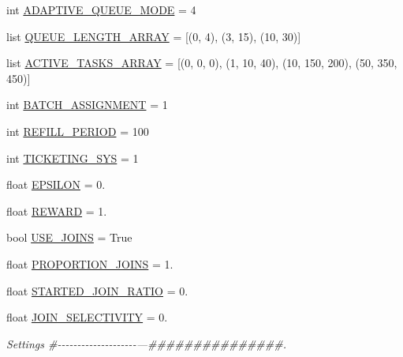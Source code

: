 \begin{DoxyCompactItemize}
int \mbox{\hyperlink{namespacedynamicfilterapp_1_1toggles_ae5f3a5957b65dd5d074c52ef01e0f732}{A\+D\+A\+P\+T\+I\+V\+E\+\_\+\+Q\+U\+E\+U\+E\+\_\+\+M\+O\+DE}} = 4
\item 
list \mbox{\hyperlink{namespacedynamicfilterapp_1_1toggles_af8d4fe75258dd9f8b4c8cdb1b5b68ad1}{Q\+U\+E\+U\+E\+\_\+\+L\+E\+N\+G\+T\+H\+\_\+\+A\+R\+R\+AY}} = \mbox{[}(0, 4), (3, 15), (10, 30)\mbox{]}
\item 
list \mbox{\hyperlink{namespacedynamicfilterapp_1_1toggles_a8f7b1e7beea29c74a7defab7d44ef294}{A\+C\+T\+I\+V\+E\+\_\+\+T\+A\+S\+K\+S\+\_\+\+A\+R\+R\+AY}} = \mbox{[}(0, 0, 0), (1, 10, 40), (10, 150, 200), (50, 350, 450)\mbox{]}
\item 
int \mbox{\hyperlink{namespacedynamicfilterapp_1_1toggles_ab1f6b66c3fc1afbd280b14695b54f33f}{B\+A\+T\+C\+H\+\_\+\+A\+S\+S\+I\+G\+N\+M\+E\+NT}} = 1
\item 
int \mbox{\hyperlink{namespacedynamicfilterapp_1_1toggles_a26c4f956b0a9438426925bee66b89a2b}{R\+E\+F\+I\+L\+L\+\_\+\+P\+E\+R\+I\+OD}} = 100
\item 
int \mbox{\hyperlink{namespacedynamicfilterapp_1_1toggles_a4efd3667e6643a4cd2b96c4e647fa2f7}{T\+I\+C\+K\+E\+T\+I\+N\+G\+\_\+\+S\+YS}} = 1
\item 
float \mbox{\hyperlink{namespacedynamicfilterapp_1_1toggles_a5f5369d7244632ac071379fbb460c8fe}{E\+P\+S\+I\+L\+ON}} = 0.
\item 
float \mbox{\hyperlink{namespacedynamicfilterapp_1_1toggles_a058a8495c920cb75e731931532524c19}{R\+E\+W\+A\+RD}} = 1.
\item 
bool \mbox{\hyperlink{namespacedynamicfilterapp_1_1toggles_a5740b01cf5a5537c768820e758a2cedf}{U\+S\+E\+\_\+\+J\+O\+I\+NS}} = True
\item 
float \mbox{\hyperlink{namespacedynamicfilterapp_1_1toggles_a943c36531eb68e7cbe2ee3ac0010f01f}{P\+R\+O\+P\+O\+R\+T\+I\+O\+N\+\_\+\+J\+O\+I\+NS}} = 1.
\item 
float \mbox{\hyperlink{namespacedynamicfilterapp_1_1toggles_aad6ab6da90f08d82dc469acf948aa64a}{S\+T\+A\+R\+T\+E\+D\+\_\+\+J\+O\+I\+N\+\_\+\+R\+A\+T\+IO}} = 0.
\item 
float \mbox{\hyperlink{namespacedynamicfilterapp_1_1toggles_aa2664d840db6239eb83fc3ddbd95e2f6}{J\+O\+I\+N\+\_\+\+S\+E\+L\+E\+C\+T\+I\+V\+I\+TY}} = 0.
\begin{DoxyCompactList}\small\item\em Settings \#-\/-\/-\/-\/-\/-\/-\/-\/-\/-\/-\/-\/-\/-\/-\/-\/-\/-\/-\/-\/---\#\#\#\#\#\#\#\#\#\#\#\#\#\#\#. \end{DoxyCompactList}\item 

\end{DoxyCompactItemize}
